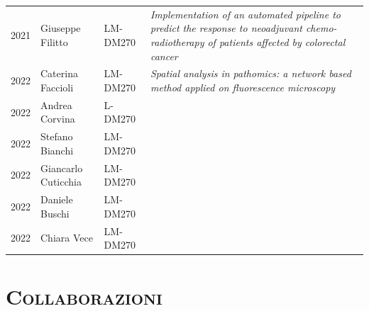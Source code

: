 \documentclass[a4paper,11pt]{article}
\begin{document}
\begin{tabular}{lllp{9cm}}
  2021 & Giuseppe Filitto      & LM-DM270 & \emph{Implementation of an automated pipeline to predict the response to neoadjuvant chemo-radiotherapy of patients affected by colorectal cancer}\\
  2022 & Caterina Faccioli     & LM-DM270 & \emph{Spatial analysis in pathomics: a network based method applied on fluorescence microscopy}\\
  2022 & Andrea Corvina        & L-DM270  & \emph{}\\
  2022 & Stefano Bianchi       & LM-DM270 & \emph{}\\
  2022 & Giancarlo Cuticchia   & LM-DM270 & \emph{}\\
  2022 & Daniele Buschi        & LM-DM270 & \emph{}\\
  2022 & Chiara Vece           & LM-DM270 & \emph{}\\

\end{tabular}




\vspace*{0.5cm}
\section*{\scshape{Collaborazioni}}
\end{document}
